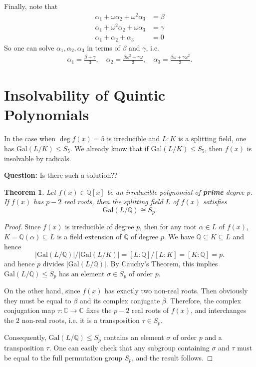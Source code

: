 \documentclass[11pt]{book}
\newtheorem{theorem}{Theorem}[section]
\begin{document}
Finally, note that
\begin{align*}
    \alpha_1 + \omega \alpha_2 + \omega^2 \alpha_3 &= \beta\\
    \alpha_1 + \omega^2 \alpha_2 + \omega \alpha_3 &= \gamma\\
    \alpha_1 + \alpha_2 + \alpha_3 &= 0
\end{align*}
So one can solve $\alpha_1, \alpha_2, \alpha_3$ in terms of $\beta$ and $\gamma$, i.e. 
\begin{align*}
\alpha_1 = \frac{\beta + \gamma}{3}, \quad
\alpha_2 = \frac{\beta \omega^2 + \gamma \omega}{3}, \quad
\alpha_3 = \frac{\beta \omega + \gamma \omega^2}{3}.
\end{align*}


\section{Insolvability of Quintic Polynomials}
In the case when \( \deg f(x) = 5 \) is irreducible and $L:K$ is a splitting field, one has \( \text{Gal}(L/K) \leq S_5 \). We already know that if $\text{Gal}(L/K) \leq S_5$, then $f(x)$ is insolvable by radicals.

\textbf{Question:} Is there such a solution??

\begin{theorem}
Let \( f(x) \in \mathbb{Q}[x] \) be an irreducible polynomial of {\bf prime} degree \( p \). If \( f(x) \) has \( p-2 \) real roots, then the splitting field \( L \) of \( f(x) \) satisfies
$$ \text{Gal}(L/\mathbb{Q}) \cong S_p. $$
\end{theorem}
\begin{proof} Since \( f(x) \) is irreducible of degree \( p \), then for any root $\alpha \in L$ of $f(x)$, $K = \mathbb{Q}(\alpha) \subseteq L$ is a field extension of \( \mathbb{Q} \) of degree \( p \).
We have $ \mathbb{Q} \subseteq K \subseteq L$ and hence
$$|\text{Gal}(L/\mathbb{Q})|/|\text{Gal}(L/K)| = [L:\mathbb{Q}]/[L:K] = [K:\mathbb{Q}] = p. $$
and hence $p$ divides $|\text{Gal}(L/\mathbb{Q})|$. By Cauchy's Theorem, this implies  \( \text{Gal}(L/\mathbb{Q}) \leq S_p \) has an element \(\sigma \in S_p\) of order \( p \).

On the other hand, since $f(x)$ has exactly two non-real roots. Then obviously they must be equal to $\beta$ and its complex conjugate $\overline{\beta}$. Therefore, the complex conjugation map $\tau: \mathbb{C} \to \mathbb{C}$ fixes the $p-2$ real roots of $f(x)$, and interchanges the $2$ non-real roots, i.e. it is a transposition \( \tau \in S_p \).

Consequently, $\text{Gal}(L/\mathbb{Q}) \leq S_p$ contains an element $\sigma$ of order $p$ and a transposition $\tau$. One can easily check that any subgroup containing $\sigma$ and $\tau$ must be equal to the full permutation group $S_p$, and the result follows.
\end{proof}
\end{document}
